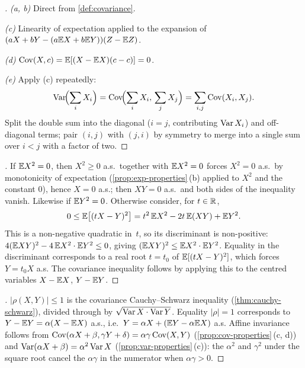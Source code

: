 \begin{proof}[]
\emph{(a, b)} Direct from \cref{def:covariance}.

\emph{(c)} Linearity of expectation applied to the expansion of
$(aX + bY - (a \mathbb{E} X + b \mathbb{E} Y))(Z - \mathbb{E} Z)$.

\emph{(d)} $\operatorname{Cov}(X, c) = \mathbb{E}[(X - \mathbb{E} X)(c - c)] = 0$.

\emph{(e)} Apply (c) repeatedly:
\[
  \operatorname{Var}\!\Bigl(\sum_i X_i\Bigr) = \operatorname{Cov}\!\Bigl(\sum_i X_i,\, \sum_j X_j\Bigr) = \sum_{i, j} \operatorname{Cov}(X_i, X_j).
\]
Split the double sum into the diagonal ($i = j$, contributing
$\operatorname{Var} X_i$) and off-diagonal terms; pair $(i, j)$ with $(j, i)$ by
symmetry to merge into a single sum over $i < j$ with a factor of
two.
\end{proof}

\begin{proof}[]
If $\mathbb{E} X^2 = 0$, then $X^2 \geq 0$ a.s.\ together with
$\mathbb{E} X^2 = 0$ forces $X^2 = 0$ a.s.\ by monotonicity of expectation
(\cref{prop:exp-properties}\,(b) applied to $X^2$ and the constant
$0$), hence $X = 0$ a.s.; then $XY = 0$ a.s.\ and both sides of the
inequality vanish. Likewise if $\mathbb{E} Y^2 = 0$. Otherwise consider, for
$t \in \mathbb{R}$,
\[
  0 \leq \mathbb{E}\bigl[(tX - Y)^2\bigr] = t^2\, \mathbb{E} X^2 - 2t\, \mathbb{E}(XY) + \mathbb{E} Y^2.
\]
This is a non-negative quadratic in~$t$, so its discriminant is
non-positive: $4 (\mathbb{E} XY)^2 - 4\, \mathbb{E} X^2 \cdot \mathbb{E} Y^2 \leq 0$, giving
$(\mathbb{E} XY)^2 \leq \mathbb{E} X^2 \cdot \mathbb{E} Y^2$. Equality in the discriminant
corresponds to a real root $t = t_0$ of $\mathbb{E}[(tX - Y)^2]$, which
forces $Y = t_0 X$ a.s. The covariance inequality follows by
applying this to the centred variables $X - \mathbb{E} X$, $Y - \mathbb{E} Y$.
\end{proof}

\begin{proof}[]
$|\rho(X, Y)| \leq 1$ is the covariance Cauchy--Schwarz inequality
(\cref{thm:cauchy-schwarz}), divided through by
$\sqrt{\operatorname{Var} X \cdot \operatorname{Var} Y}$. Equality $|\rho| = 1$ corresponds to
$Y - \mathbb{E} Y = \alpha (X - \mathbb{E} X)$ a.s., i.e.\ $Y = \alpha X + (\mathbb{E} Y - \alpha \mathbb{E} X)$ a.s.
Affine invariance follows from
$\operatorname{Cov}(\alpha X + \beta, \gamma Y + \delta) = \alpha \gamma \operatorname{Cov}(X, Y)$
(\cref{prop:cov-properties}\,(c, d)) and
$\operatorname{Var}(\alpha X + \beta) = \alpha^2 \operatorname{Var} X$
(\cref{prop:var-properties}\,(c)): the $\alpha^2$ and $\gamma^2$
under the square root cancel the $\alpha \gamma$ in the numerator
when $\alpha \gamma > 0$.
\end{proof}

